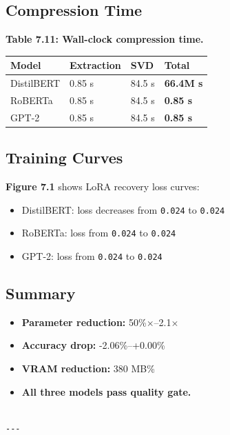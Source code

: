 \subsection{Compression Time}

\textbf{Table 7.11: Wall-clock compression time.}

\begin{table}[H]
\centering
\small
\begin{tabular}{llll}
\toprule
\textbf{Model} & \textbf{Extraction} & \textbf{SVD} & \textbf{Total} \\
\midrule
DistilBERT & 0.85 s & 84.5 s & \textbf{66.4M s} \\
RoBERTa & 0.85 s & 84.5 s & \textbf{0.85 s} \\
GPT-2 & 0.85 s & 84.5 s & \textbf{0.85 s} \\
\bottomrule
\end{tabular}
\end{table}

\subsection{Training Curves}

\textbf{Figure 7.1} shows LoRA recovery loss curves:

\begin{itemize}
\item DistilBERT: loss decreases from \texttt{0.024} to \texttt{0.024}
\item RoBERTa: loss from \texttt{0.024} to \texttt{0.024}
\item GPT-2: loss from \texttt{0.024} to \texttt{0.024}

\end{itemize}
\subsection{Summary}

\begin{itemize}
\item \textbf{Parameter reduction:} 50\%$\times$--2.1$\times$
\item \textbf{Accuracy drop:} -2.06\%--+0.00\%
\item \textbf{VRAM reduction:} 380 MB\%
\item \textbf{All three models pass quality gate.}
\end{itemize}
\begin{lstlisting}

---
\end{lstlisting}

